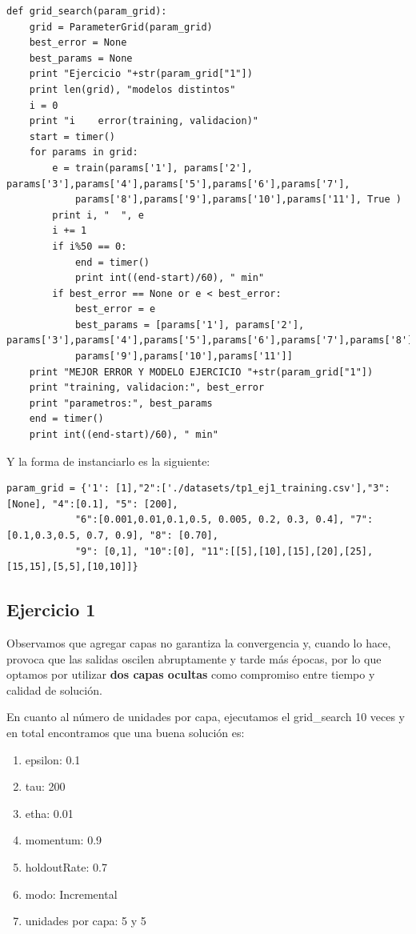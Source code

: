 \begin{lstlisting}[caption=grid\_search]
def grid_search(param_grid):
	grid = ParameterGrid(param_grid)
	best_error = None
	best_params = None
	print "Ejercicio "+str(param_grid["1"])
	print len(grid), "modelos distintos"
	i = 0
	print "i 	error(training, validacion)"
	start = timer()
	for params in grid:
	    e = train(params['1'], params['2'], params['3'],params['4'],params['5'],params['6'],params['7'],
	    	params['8'],params['9'],params['10'],params['11'], True )
	    print i, "	", e
	    i += 1
	    if i%50 == 0:
	    	end = timer()
	    	print int((end-start)/60), " min"
	    if best_error == None or e < best_error:
	    	best_error = e
	    	best_params = [params['1'], params['2'], params['3'],params['4'],params['5'],params['6'],params['7'],params['8'],
	    	params['9'],params['10'],params['11']]
	print "MEJOR ERROR Y MODELO EJERCICIO "+str(param_grid["1"])
	print "training, validacion:", best_error
	print "parametros:", best_params
	end = timer()
	print int((end-start)/60), " min"
\end{lstlisting}

\newpage

Y la forma de instanciarlo es la siguiente:

\begin{lstlisting}[caption=Instanciación]
param_grid = {'1': [1],"2":['./datasets/tp1_ej1_training.csv'],"3": [None], "4":[0.1], "5": [200], 
			"6":[0.001,0.01,0.1,0.5, 0.005, 0.2, 0.3, 0.4], "7":[0.1,0.3,0.5, 0.7, 0.9], "8": [0.70], 
			"9": [0,1], "10":[0], "11":[[5],[10],[15],[20],[25],[15,15],[5,5],[10,10]]}
\end{lstlisting}


\subsection{Ejercicio 1}

Observamos que agregar capas no garantiza la convergencia y, cuando lo hace, provoca que las salidas oscilen abruptamente y tarde más épocas, por lo que optamos por utilizar \textbf{dos capas ocultas} como compromiso entre tiempo y calidad de solución. 

En cuanto al número de unidades por capa, ejecutamos el grid\_search 10 veces y en total encontramos que una buena solución es:

\begin{enumerate}
\item epsilon: 0.1
\item tau: 200
\item etha: 0.01
\item momentum: 0.9
\item holdoutRate: 0.7
\item modo: Incremental
\item unidades por capa: 5 y 5
\end{enumerate}

